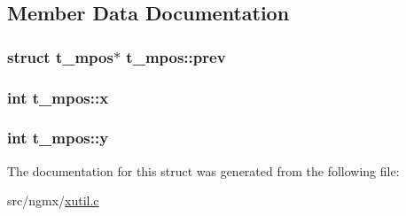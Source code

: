 \subsection{\-Member \-Data \-Documentation}
\hypertarget{structt__mpos_a567d32671d47d2c2aa189832fe9e16d0}{
\subsubsection[{prev}]{\setlength{\rightskip}{0pt plus 5cm}struct {\bf t\-\_\-mpos}$\ast$ {\bf t\-\_\-mpos\-::prev}}}\label{structt__mpos_a567d32671d47d2c2aa189832fe9e16d0}
\hypertarget{structt__mpos_a2535bf443d53be4012aea635703805d8}{
\subsubsection[{x}]{\setlength{\rightskip}{0pt plus 5cm}int {\bf t\-\_\-mpos\-::x}}}\label{structt__mpos_a2535bf443d53be4012aea635703805d8}
\hypertarget{structt__mpos_ad3333872f81be5e53199b93d9cb1c4a2}{
\subsubsection[{y}]{\setlength{\rightskip}{0pt plus 5cm}int {\bf t\-\_\-mpos\-::y}}}\label{structt__mpos_ad3333872f81be5e53199b93d9cb1c4a2}


\-The documentation for this struct was generated from the following file\-:\begin{DoxyCompactItemize}
\item 
src/ngmx/\hyperlink{xutil_8c}{xutil.\-c}\end{DoxyCompactItemize}
